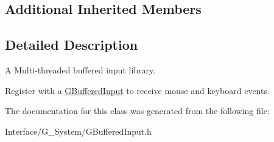 \subsection*{Additional Inherited Members}


\subsection{Detailed Description}
A Multi-\/threaded buffered input library. 

Register with a \hyperlink{classGW_1_1SYSTEM_1_1GBufferedInput}{G\+Buffered\+Input} to receive mouse and keyboard events. 

The documentation for this class was generated from the following file\+:\begin{DoxyCompactItemize}
\item 
Interface/\+G\+\_\+\+System/G\+Buffered\+Input.\+h\end{DoxyCompactItemize}
